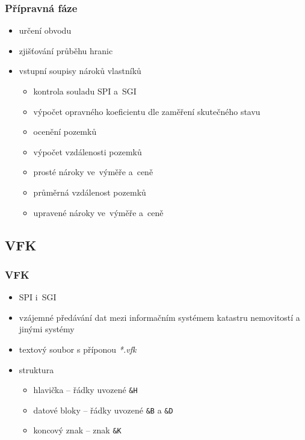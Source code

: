 \documentclass{beamer}
\begin{document}

\begin{frame}

\frametitle{Přípravná fáze}

\begin{itemize}
	\item určení obvodu
	\item zjišťování průběhu hranic
	\item vstupní soupisy nároků vlastníků
	\begin{itemize}
		\item kontrola souladu SPI a~SGI
		\item výpočet opravného koeficientu dle zaměření skutečného stavu
		\item ocenění pozemků
		\item výpočet vzdálenosti pozemků
		\item prosté nároky ve~výměře a~ceně
		\item průměrná vzdálenost pozemků
		\item upravené nároky ve~výměře a~ceně
	\end{itemize}
\end{itemize}

\end{frame}


\subsection{VFK}

\begin{frame}

\frametitle{VFK}

\begin{itemize}
	\item SPI i~SGI
	\item vzájemné předávání dat mezi informačním systémem katastru nemovitostí a jinými systémy
	\item textový soubor s příponou \textit{*.vfk}
	\item struktura
	\begin{itemize}
		\item hlavička – řádky uvozené \texttt{\&H}
		\item datové bloky – řádky uvozené \texttt{\&B} a \texttt{\&D}
		\item koncový znak – znak \texttt{\&K}
	\end{itemize}
\end{itemize}

\end{frame}
\end{document}
